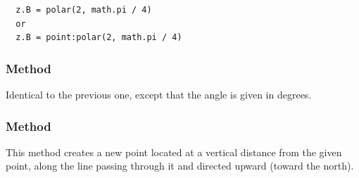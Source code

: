 \vspace{1em}

\begin{mybox}
\begin{verbatim}
  z.B = polar(2, math.pi / 4)
  or
  z.B = point:polar(2, math.pi / 4)
\end{verbatim}
\end{mybox}

\begin{tkzexample}[latex = 7cm]
\begin{center}
\end{center}

\end{tkzexample}

\subsubsection{Method }
\label{ssub:method_point_polar_deg}

Identical to the previous one, except that the angle is given in degrees.

\begin{tkzexample}[latex=7cm]
\begin{center}
\end{center}
\end{tkzexample}

\subsubsection{Method }
\label{ssub:example_method_point_north_d}

This method creates a new point located at a vertical distance from the given point, along the line passing through it and directed upward (toward the north).

